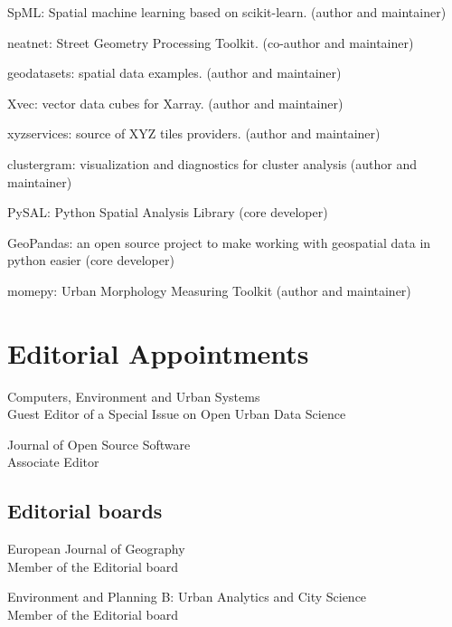 \documentclass[12pt,a4paper]{report}
\begin{document}
    \begin{tablist}

        \item[2026--] \tab{}SpML: Spatial machine learning based on scikit-learn. (author and maintainer)
        \item[2025--] \tab{}neatnet: Street Geometry Processing Toolkit. (co-author and maintainer)
        \item[2023--] \tab{}geodatasets: spatial data examples. (author and maintainer)
        \item[2022--] \tab{}Xvec: vector data cubes for Xarray. (author and maintainer)
        \item[2021--] \tab{}xyzservices: source of XYZ tiles providers. (author and maintainer)
        \item[2020--] \tab{}clustergram: visualization and diagnostics for cluster analysis (author and maintainer)
        \item[2020--] \tab{}PySAL: Python Spatial Analysis Library (core developer)
        \item[2019--] \tab{}GeoPandas: an open source project to make working with geospatial data in python easier (core developer)
        \item[2018--] \tab{}momepy: Urban Morphology Measuring Toolkit (author and maintainer)

    \end{tablist}

    \section*{Editorial Appointments}

    \begin{tablist}

        \item[2025--26] \tab{}Computers, Environment and Urban Systems\\
                            Guest Editor of a Special Issue on Open Urban Data Science

        \item[2021--25] \tab{}Journal of Open Source Software \\
                            Associate Editor
    
    \subsection*{Editorial boards}

        \item[2026--] \tab{}European Journal of Geography\\
                    Member of the Editorial board


        \item[2026--] \tab{}Environment and Planning B: Urban Analytics and City Science\\
                    Member of the Editorial board

    \end{tablist}
\end{document}
